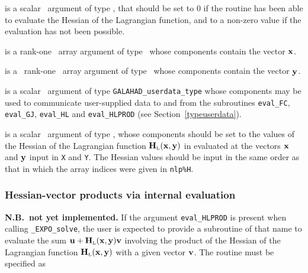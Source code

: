 \documentclass{galahad}
\newcommand{\packagename}{EXPO}
\newcommand{\fullpackagename}{\libraryname\_\packagename}
\newcommand{\solver}{{\tt \fullpackagename\_solve}}
\newcommand{\bmHL}{\bmH\sub{L}}
\begin{document}
\begin{description}
 is a scalar \intentout\ argument of type \integer,
that should be set to 0 if the routine has been able to evaluate
the Hessian of the Lagrangian function,
and to a non-zero value if the evaluation has not been possible.

 is a rank-one \intentin\ array argument of type \realdp\
whose components contain the vector ${\mathbf{x}}$.

 is a \ rank-one \intentin\ array argument of type
\realdp\ whose components contain the vector ${\mathbf{y}}$.

 is a scalar \intentinout\ argument of type
{\tt GALAHAD\_userdata\_type} whose components may be used
to communicate user-supplied data to and from the
subroutines {\tt eval\_FC}, {\tt eval\_GJ},
{\tt eval\_HL} and {\tt eval\_HLPROD}
(see Section~\ref{typeuserdata}).

 is a scalar \intentout\ argument of type \realdp,
whose components should be set to the values of the Hessian
of the Lagrangian function $\bmHL(\bmx,\bmy)$ in 
evaluated at the vectors ${\mathbf{x}}$ and ${\mathbf{y}}$  input in {\tt X} and {\tt Y}. 
The Hessian values should be input in the same order as that in which 
the array indices were given in {\tt nlp\%H}.


\end{description}


\subsubsection{Hessian-vector products via internal evaluation\label{hvfv}}

{\bf N.B.\ not yet implemented.}
If the argument {\tt eval\_HLPROD} is present when calling \solver, the
user is expected to provide a subroutine of that name to evaluate the
sum $\bmu + \bmHL(\bmx,\bmy) \bmv$ involving the
product of the Hessian of the Lagrangian function $\bmHL(\bmx,\bmy)$
with a given vector ${\mathbf{v}}$. The routine must be specified as
\end{document}
